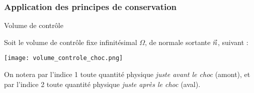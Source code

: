\subsubsection{Application des principes de conservation}
\begin{frame}{Volume de contrôle}

\small

Soit le volume de contrôle fixe infinitésimal $\Omega$, de normale sortante $\vec{n}$,
suivant :

\begin{center}
	\texttt{[image: volume\_controle\_choc.png]}
\end{center}

On notera par l'indice 1 toute quantité physique \textsl{juste avant le choc} (amont), et
 par l'indice 2 toute quantité physique \textsl{juste après le choc} (aval).

\vspace{5mm}

\end{frame}


